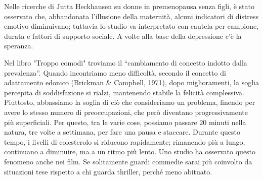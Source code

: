 \documentclass[12pt]{book} %
\begin{document}
Nelle ricerche di Jutta Heckhausen su donne in premenopausa senza figli, è stato osservato che, abbandonata l’illusione della maternità, alcuni indicatori di distress emotivo diminuivano; tuttavia lo studio va interpretato con cautela per campione, durata e fattori di supporto sociale. A volte alla base della depressione c'è la speranza. 

Nel libro "Troppo comodi" troviamo il “cambiamento di concetto indotto dalla prevalenza”. Quando incontriamo meno difficoltà, secondo il concetto di adattamento edonico (Brickman \& Campbell, 1971), dopo miglioramenti, la soglia percepita di soddisfazione si rialzi, mantenendo stabile la felicità complessiva. Piuttosto, abbassiamo la soglia di ciò che consideriamo un problema, finendo per avere lo stesso numero di preoccupazioni, che però diventano progressivamente più superficiali. Per questo, tra le varie cose, possiamo passare 20 minuti nella natura, tre volte a settimana, per fare una pausa e staccare. Durante questo tempo, i livelli di colesterolo si riducono rapidamente; rimanendo più a lungo, continuano a diminuire, ma a un ritmo più lento. Uno studio ha osservato questo fenomeno anche nei film. Se solitamente guardi commedie sarai più coinvolto da situazioni tese rispetto a chi guarda thriller, perché meno abituato.
\end{document}
